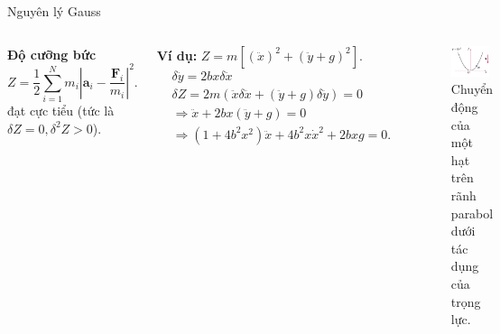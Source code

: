 \begin{frame}{Nguyên lý Gauss}

\begin{columns}
    \textbf{Độ cưỡng bức}
    \begin{equation}
        Z = \frac{1}{2} \sum_{i=1}^{N} m_i \left| \mathbf{a}_i - \frac{\mathbf{F}_i}{m_i} \right|^2.
    \end{equation}
    đạt cực tiểu (tức là \(\delta Z = 0, \delta^2 Z > 0\)).

    \textbf{Ví dụ:} \( Z = m \left[ \left( \ddot{x} \right)^2 + \left( \ddot{y} + g \right)^2 \right]\).
    \vspace{-2mm}
    \begin{align}
        & \delta \ddot{y} = 2 b x \delta \ddot{x} \\
        & \delta Z = 2m \left( \ddot{x} \delta \ddot{x} + \left( \ddot{y} + g \right) \delta \ddot{y} \right) = 0 \\
        & \Rightarrow \ddot{x} + 2b x \left( \ddot{y} + g \right) = 0 \\
        & \Rightarrow \left( 1 + 4 b^2 x^2 \right) \ddot{x} + 4 b^2 x \dot{x}^2 + 2 b x g = 0.
    \end{align}

    \vspace{-6mm}
    \begin{figure}
        \centering
        \includegraphics[width=0.9\textwidth]{Figures/Parabol_motion.pdf}
        \vspace{-2mm}
        \caption{Chuyển động của một hạt trên rãnh parabol dưới tác dụng của trọng lực.}
    \end{figure}
\end{columns}

\end{frame}

